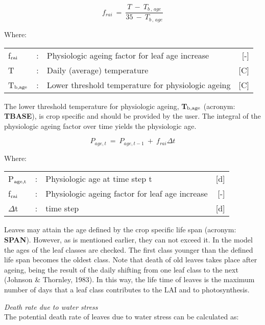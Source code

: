 \begin{equation}
f _{rai} ~=~{\frac{ T~-~T _{b\, ,\, age} }{35~-~ T _{b\, ,\, age} }}
\end{equation}

Where:\\[5pt]
\begin{tabularx}{\textwidth}{llXr}
	f$_{{\rm rai}}$ &:& Physiologic ageing factor for leaf age increase   & 	[-]\\
	T &:& Daily (average) temperature   & 	[\textdegree C]\\
	T$_{{\rm b,age}}$ &:& Lower threshold temperature for physiologic ageing   & 	[\textdegree C]\\
\end{tabularx}

The lower threshold temperature for physiologic ageing, {\bf T$_{{\rm b,age}}$} (acronym: {\bf TBASE}), is
crop specific and should be provided by the user. The integral of the physiologic ageing
factor over time yields the physiologic age. 

\begin{equation}
\label{eq:5.57}
P _{age,t} ~=~ P _{age,t-1} ~+~f_{rai} \Delta t
\end{equation}

Where:\\[5pt]
\begin{tabularx}{\textwidth}{llXr}
	P$_{{\rm age,t}}$ &:& Physiologic age at time step t & [d]\\
	f$_{{\rm rai}}$ &:& Physiologic ageing factor for leaf age increase & [-]\\
	$\Delta$t &:& time step & [d]\\
\end{tabularx}

Leaves may attain the age defined by the crop specific life span (acronym: {\bf SPAN}).
However, as is mentioned earlier, they can not exceed it. In the model the ages of the
leaf classes are checked. The first class younger than the defined life span becomes the
oldest class. Note that death of old leaves takes place after ageing, being the result of the
daily shifting from one leaf class to the next (Johnson \& Thornley, 1983). In this way,
the life time of leaves is the maximum number of days that a leaf class contributes to the
LAI and to photosynthesis.

{\it Death rate due to water stress}\\
The potential death rate of leaves due to water stress can be calculated as:

